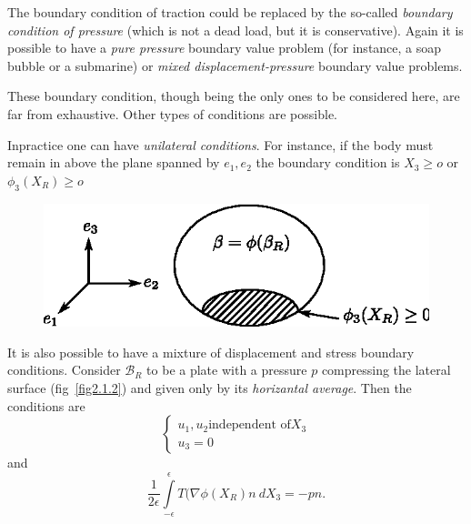  The boundary condition of traction could be replaced by the so-called
 {\em boundary condition of pressure} (which is not a dead load, but it is 
 conservative). Again it is possible to have a {\em pure pressure} boundary
 value problem (for instance, a soap bubble or a submarine) or {\em mixed
 displacement-pressure} boundary value problems. 
 
 These boundary condition, though being the only ones to be
 considered here, are far from exhaustive. Other types of conditions
 are possible. 
 
 In\pageoriginale practice one can have {\em unilateral
   conditions}. For instance, if the 
 body must remain in above the plane spanned by $e_1,e_2$ the boundary
 condition is $X_3 \geq o$ or $\phi_3 (X_R) \geq o$  
 
\setcounter{figure}{0}
\begin{figure}[H]
\centering
\includegraphics{vol71-figures/fig2.1-1.eps}
\medskip
\caption{}\label{fig2.1.1}
\end{figure}

It is also possible to have a mixture of displacement and stress boun\-dary
conditions. Consider $\mathcal{B}_R$ to be a plate with a pressure $p$
compressing the lateral surface (fig~\ref{fig2.1.2}) and given only by its
{\em horizantal average}. Then the conditions are  
\begin{equation*}
  \begin{cases}
    u_1, u_2 \text{independent of} X_3\\
    u_3 = 0 \tag{2.1-7}\label{eq2.1-7}
  \end{cases}
\end{equation*} 
 and
\begin{equation*}
   \frac{1}{2 \epsilon} \int\limits_{-\epsilon}^{\epsilon} T
   (\nabla \phi (X_R)n~ dX_3 = -pn. \tag{2.1-8} \label{eq2.1-8}
\end{equation*} 
 

